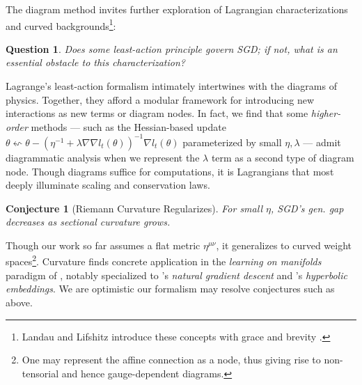 \documentclass{article}
\theoremstyle{plain}
\newtheorem{conj}{Conjecture}
\newtheorem{quest}{Question}
\theoremstyle{definition}
\begin{document}

    The diagram method invites further exploration of Lagrangian
    characterizations and curved backgrounds\footnote{
        Landau and Lifshitz introduce these concepts with grace and brevity
        .
    }:
    \begin{quest}
        Does some least-action principle govern SGD; if not,
        what is an essential obstacle to this characterization?
    \end{quest}
        Lagrange's least-action formalism intimately intertwines with the
        diagrams of physics.  Together, they afford a modular framework for
        introducing new interactions as new terms or diagram nodes.  In fact,
        we find that some \emph{higher-order} methods --- such as the
        Hessian-based update
        $
            \theta \leftsquigarrow
            \theta -
            (\eta^{-1} + \lambda \nabla \nabla l_t(\theta))^{-1}
            \nabla l_t(\theta)
        $
        parameterized by small $\eta, \lambda$ --- admit diagrammatic analysis
        when we represent the $\lambda$ term as a second type of
        diagram node.  Though diagrams suffice for computations, it is
        Lagrangians that most deeply illuminate scaling and conservation laws.
    \begin{conj}[Riemann Curvature Regularizes]
        For small $\eta$, SGD's gen. gap decreases as sectional curvature
        grows.
    \end{conj}
        Though our work so far assumes a flat metric $\eta^{\mu\nu}$, it 
        generalizes to curved weight spaces\footnote{
            One may represent the affine connection as a node, thus giving
            rise to non-tensorial and hence gauge-dependent diagrams.
        }.
        Curvature finds concrete application in the \emph{learning on
        manifolds} paradigm of \citet{bo13}, notably specialized to
        \citet{am98}'s \emph{natural gradient descent} and \citet{ni17}'s
        \emph{hyperbolic embeddings}.  We are optimistic our formalism may
        resolve conjectures such as above.

\end{document}
